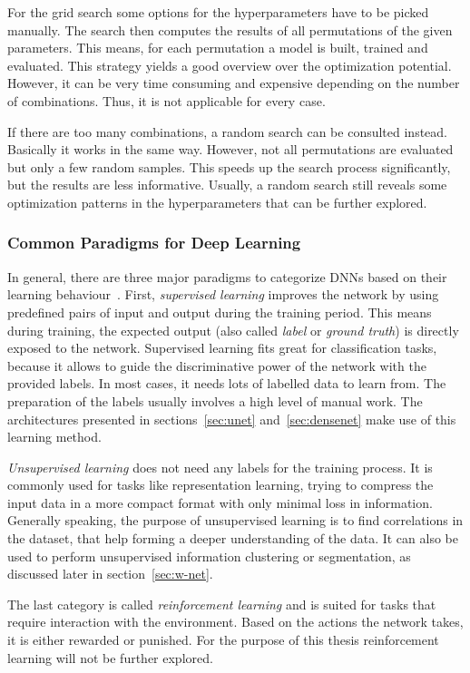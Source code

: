 For the grid search some options for the hyperparameters have to be  picked manually. The search then computes the results of all permutations of the given parameters. This means, for each permutation a model is built, trained and evaluated. This strategy yields a good overview over the optimization potential. However, it can be very time consuming and expensive depending on the number of combinations. Thus, it is not applicable for every case.

If there are too many combinations, a random search can be consulted instead. Basically it works in the same way. However, not all permutations are evaluated but only a few random samples. This speeds up the search process significantly, but the results are less informative. Usually, a random search still reveals some optimization patterns in the hyperparameters that can be further explored.

\subsubsection{Common Paradigms for Deep Learning}
\label{sec:dl_paradigms}
In general, there are three major paradigms to categorize DNNs based on their learning behaviour~\cite[p.~214f]{dlma14}. First, \emph{supervised learning} improves the network by using predefined pairs of input and output during the training period. This means during training, the expected output (also called \emph{label} or \emph{ground truth}) is directly exposed to the network. Supervised learning fits great for classification tasks, because it allows to guide the discriminative power of the network with the provided labels. In most cases, it needs lots of labelled data to learn from. The preparation of the labels usually involves a high level of manual work. The architectures presented in sections~\ref{sec:unet} and~\ref{sec:densenet} make use of this learning method.

\emph{Unsupervised learning} does not need any labels for the training process. It is commonly used for tasks like representation learning, trying to compress the input data in a more compact format with only minimal loss in information. Generally speaking, the purpose of unsupervised learning is to find correlations in the dataset, that help forming a deeper understanding of the data. It can also be used to perform unsupervised information clustering or segmentation, as discussed later in section~\ref{sec:w-net}.

The last category is called \emph{reinforcement learning} and is suited for tasks that require interaction with the environment. Based on the actions the network takes, it is either rewarded or punished. For the purpose of this thesis reinforcement learning will not be further explored.


